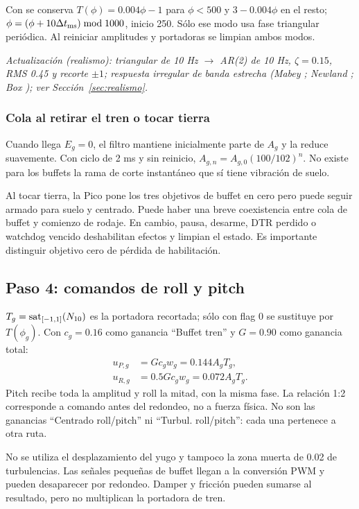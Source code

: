 Con  se conserva $T(\phi)=0.004\phi-1$ para $\phi<500$ y $3-0.004\phi$ en el resto; $\phi=(\phi+10\Delta t_{\rm ms})\bmod1000$, inicio 250. Sólo ese modo usa fase triangular periódica. Al reiniciar amplitudes y portadoras se limpian ambos modos.

\textit{Actualización (realismo): triangular de 10 Hz $\rightarrow$ AR(2) de 10 Hz, $\zeta=0.15$, RMS 0.45 y recorte $\pm1$; respuesta irregular de banda estrecha (Mabey \cite{mabey1988}; Newland \cite{newland1993}; Box \cite{box}); ver Sección~\ref{sec:realismo}.}

\subsubsection{Cola al retirar el tren o tocar tierra}
Cuando llega $E_g=0$, el filtro mantiene inicialmente parte de $A_g$ y la reduce suavemente. Con ciclo de 2 ms y sin reinicio, $A_{g,n}=A_{g,0}(100/102)^n$. No existe para los buffets la rama de corte instantáneo que sí tiene vibración de suelo.

Al tocar tierra, la Pico pone los tres objetivos de buffet en cero pero puede seguir armado para suelo y centrado. Puede haber una breve coexistencia entre cola de buffet y comienzo de rodaje. En cambio, pausa, desarme, DTR perdido o watchdog vencido deshabilitan efectos y limpian el estado. Es importante distinguir objetivo cero de pérdida de habilitación.

\subsection{Paso 4: comandos de roll y pitch}
$T_g=\operatorname{sat}_{[-1,1]}(N_{10})$ es la portadora recortada; sólo con flag 0 se sustituye por $T(\phi_g)$.
Con $c_g=0.16$ como ganancia ``Buffet tren'' y $G=0.90$ como ganancia total:
\begin{align}
u_{P,g}&=G c_g w_g=0.144 A_gT_g,\\
u_{R,g}&=0.5G c_g w_g=0.072 A_gT_g.
\end{align}
Pitch recibe toda la amplitud y roll la mitad, con la misma fase. La relación 1:2 corresponde a comando antes del redondeo, no a fuerza física. No son las ganancias ``Centrado roll/pitch'' ni ``Turbul. roll/pitch'': cada una pertenece a otra ruta.

No se utiliza el desplazamiento del yugo y tampoco la zona muerta de 0.02 de turbulencias. Las señales pequeñas de buffet llegan a la conversión PWM y pueden desaparecer por redondeo. Damper y fricción pueden sumarse al resultado, pero no multiplican la portadora de tren.

